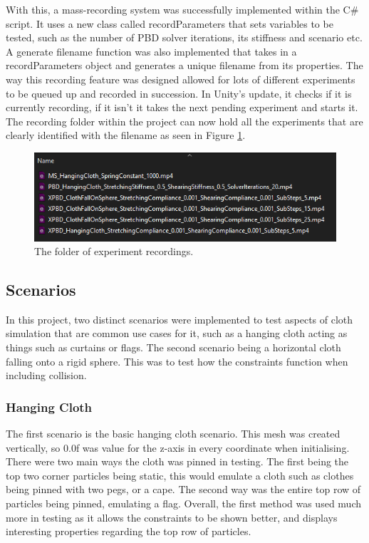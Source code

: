 \documentclass[12pt,a4paper]{article}
\begin{document}
With this, a mass-recording system was successfully implemented within the C\# script. It uses a new class called recordParameters that sets variables to be tested, such as the number of PBD solver iterations, its stiffness and scenario etc. A generate filename function was also implemented that takes in a recordParameters object and generates a unique filename from its properties. The way this recording feature was designed allowed for lots of different experiments to be queued up and recorded in succession. In Unity's update, it checks if it is currently recording, if it isn't it takes the next pending experiment and starts it. The recording folder within the project can now hold all the experiments that are clearly identified with the filename as seen in Figure \ref{fig:recs}.

\begin{figure}
	\centering
	\includegraphics[scale=0.8]{recs.png}
	\caption{The folder of experiment recordings.}
	\label{fig:recs}
\end{figure}


\subsection{Scenarios}
In this project, two distinct scenarios were implemented to test aspects of cloth simulation that are common use cases for it, such as a hanging cloth acting as things such as curtains or flags. The second scenario being a horizontal cloth falling onto a rigid sphere. This was to test how the constraints function when including collision. 
\subsubsection{Hanging Cloth}
The first scenario is the basic hanging cloth scenario. This mesh was created vertically, so 0.0f was value for the z-axis in every coordinate when initialising. There were two main ways the cloth was pinned in testing. The first being the top two corner particles being static, this would emulate a cloth such as clothes being pinned with two pegs, or a cape. The second way was the entire top row of particles being pinned, emulating a flag. Overall, the first method was used much more in testing as it allows the constraints to be shown better, and displays interesting properties regarding the top row of particles. \\
\end{document}
